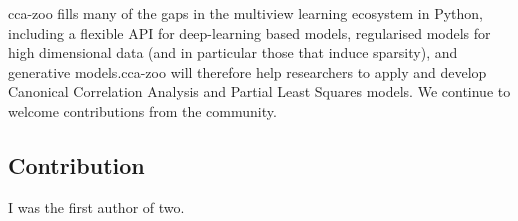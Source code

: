 cca-zoo fills many of the gaps in the multiview learning ecosystem in Python, including a flexible API for deep-learning based models, regularised models for high dimensional data (and in particular those that induce sparsity), and generative models.cca-zoo will therefore help researchers to apply and develop Canonical Correlation Analysis and Partial Least Squares models. We continue to welcome contributions from the community.

\subsection{Contribution}

I was the first author of two.